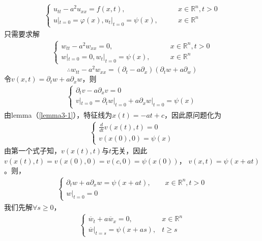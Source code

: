 \documentclass[11pt, a4paper]{article}
\theoremstyle{theorem}
\begin{document}
\begin{align}
\label{func3-12}
    \begin{cases}
    u_{tt} - a^2 u_{xx} = f(x,t), \quad \quad &x \in \mathbb{R}^n, t > 0 \\
    u|_{t = 0} = \varphi(x), u_t|_{t = 0} = \psi(x), \quad \quad &x \in \mathbb{R}^n
    \end{cases}
\end{align}
只需要求解
\begin{align*}
    \begin{cases}
    w_{tt} - a^2 w_{xx} = 0, \quad \quad &x \in \mathbb{R}^n, t > 0 \\
    w|_{t = 0} = 0, w_t|_{t = 0} = \psi(x),\quad \quad &x \in \mathbb{R}^n
    \end{cases}
\end{align*}
$$
\therefore w_{tt} - a^2 w_{xx} = (\partial_t - a \partial_x)(\partial_t w + a \partial_w)
$$
令$v(x,t) = \partial_t w +  a \partial_x w$，则
\begin{align*}
    \begin{cases}
    \partial_t v- a \partial_x v= 0 \\
    v|_{t = 0} = \partial_t w|_{t = 0} +  a \partial_x w|_{t = 0} = \psi(x)
    \end{cases}
\end{align*}
由lemma（\ref{lemma3-1}），特征线为$x(t) = -at + c$，因此原问题化为
\begin{align*}
    \begin{cases}
    \frac{d}{d t} v(x(t),t)= 0 \\
    v(x(0),0) = \psi(x)
    \end{cases}
\end{align*}
由第一个式子知，$v(x(t),t)$与$t$无关，因此$v(x(t),t) = v(x(0),0) = v(c,0) = \psi(x(0))$，
$v(x,t) = \psi(x + at)$。则，
\begin{align}
\label{func3-10}
    \begin{cases}
    \partial_t w + a \partial_x w = \psi(x + at), \quad \quad x \in \mathbb{R}^n, t > 0 \\
    w|_{t = 0} = 0
    \end{cases}
\end{align}
我们先解$\forall s \geq 0$，
\begin{align}
\label{func3-11}
    \begin{cases}
    \overline{w}_t + a \overline{w}_x = 0, \quad \quad &x \in \mathbb{R}^n \\
    \overline{w}|_{t=s} = \psi(x + as), & t \geq s
    \end{cases}
\end{align}
\end{document}
